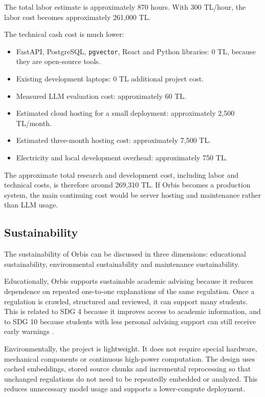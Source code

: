 \documentclass[a4paper,12pt]{article}
\begin{document}
The total labor estimate is approximately 870 hours. With 300 TL/hour, the labor cost becomes approximately 261{,}000 TL.

The technical cash cost is much lower:

\begin{itemize}
    \item FastAPI, PostgreSQL, \texttt{pgvector}, React and Python libraries: 0 TL, because they are open-source tools.
    \item Existing development laptops: 0 TL additional project cost.
    \item Measured LLM evaluation cost: approximately 60 TL.
    \item Estimated cloud hosting for a small deployment: approximately 2{,}500 TL/month.
    \item Estimated three-month hosting cost: approximately 7{,}500 TL.
    \item Electricity and local development overhead: approximately 750 TL.
\end{itemize}

The approximate total research and development cost, including labor and technical costs, is therefore around 269{,}310 TL. If Orbis becomes a production system, the main continuing cost would be server hosting and maintenance rather than LLM usage.

\subsection{Sustainability}
The sustainability of Orbis can be discussed in three dimensions: educational sustainability, environmental sustainability and maintenance sustainability.

Educationally, Orbis supports sustainable academic advising because it reduces dependence on repeated one-to-one explanations of the same regulation. Once a regulation is crawled, structured and reviewed, it can support many students. This is related to SDG 4 because it improves access to academic information, and to SDG 10 because students with less personal advising support can still receive early warnings \cite{unSdgs}.

Environmentally, the project is lightweight. It does not require special hardware, mechanical components or continuous high-power computation. The design uses cached embeddings, stored source chunks and incremental reprocessing so that unchanged regulations do not need to be repeatedly embedded or analyzed. This reduces unnecessary model usage and supports a lower-compute deployment.
\end{document}
